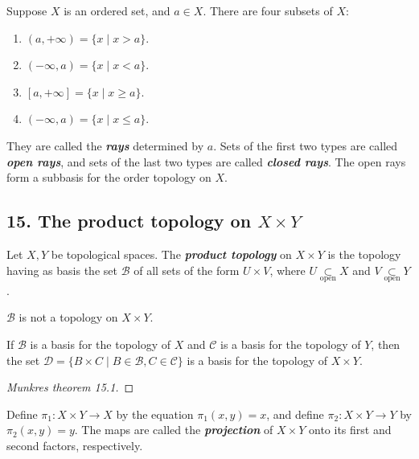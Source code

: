 \begin{mydefinition}
Suppose $X$ is an ordered set, and $a\in X$. There are four subsets of $X$:
\begin{enumerate}[label={(\alph*)}]
\item $(a,+\infty)=\{x\mid x>a\}$.
\item $(-\infty,a)=\{x\mid x<a\}$.
\item $[a,+\infty]=\{x\mid x\geq a\}$.
\item $(-\infty,a)=\{x\mid x\leq a\}$.
\end{enumerate}
They are called the \textbf{\emph{rays}} determined by $a$. Sets of the first two types are called \textbf{\emph{open rays}}, and sets of the last two types are called \textbf{\emph{closed rays}}. The open rays form a subbasis for the order topology on $X$.
\end{mydefinition}

\subsection{15. The product topology on $X\times Y$}
\begin{mydefinition}
Let $X,Y$ be topological spaces. The \textbf{\emph{product topology}} on $X\times Y$ is the topology having as basis the set $\mathcal{B}$ of all sets of the form $U\times V$, where $U\underset{\text{open}}{\subset}X$ and $V\underset{\text{open}}{\subset}Y$. 
\end{mydefinition}

\begin{remark}
$\mathcal{B}$ is not a topology on $X\times Y$.
\end{remark}

\begin{mytheorem}
If $\mathcal{B}$ is a basis for the topology of $X$ and $\mathcal{C}$ is a basis for the topology of $Y$, then the set $\mathcal{D}=\{B\times C\mid B\in \mathcal{B},C\in \mathcal{C}\}$ is a basis for the topology of $X\times Y$.
\end{mytheorem}
\begin{proof}
[Munkres theorem 15.1]
\end{proof}

\begin{mydefinition}
Define $\pi_1:X\times Y\to X$ by the equation $\pi_1(x,y)=x$, and define $\pi_2:X\times Y\to Y$ by $\pi_2(x,y)=y$. The maps are called the \textbf{\emph{projection}} of $X\times Y$ onto its first and second factors, respectively.
\end{mydefinition}

